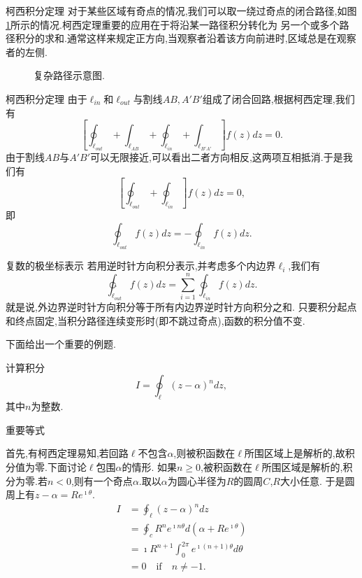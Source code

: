 \documentclass[fontset=windows, chinese, 10pt]{beamer}
\begin{document}
\begin{frame}{柯西积分定理}
  \small
  对于某些区域有奇点的情况,我们可以取一绕过奇点的闭合路径,如图\ref{fig:complexregion}所示的情况.柯西定理重要的应用在于将沿某一路径积分转化为
另一个或多个路径积分的求和.通常这样来规定正方向,当观察者沿着该方向前进时,区域总是在观察者的左侧.
\begin{figure}
    \centering
    \scalebox{0.6}{
    
    }
    \caption{复杂路径示意图.}
    \label{fig:complexregion}
\end{figure}

  \end{frame}
  

  \begin{frame}{柯西积分定理}
由于$\ell_{in}$和$\ell_{out}$与割线$AB,A'B'$组成了闭合回路,根据柯西定理,我们有
\[
    \left[ \oint _{\ell_{out}} + \int _{\ell_{AB}} + \oint _{\ell_{in}} + \int _{\ell_{B'A'}} \right] f(z) dz = 0 .
\]   
由于割线$AB$与$A'B'$可以无限接近,可以看出二者方向相反,这两项互相抵消.于是我们有
\[
    \left[ \oint _{\ell_{out}} + \oint _{\ell_{in}}  \right] f(z) dz = 0,
\]
即
\[
    \oint_{\ell_{out}} f(z) dz = - \oint _{\ell_{in}}f(z) dz .
\]

\end{frame}

\begin{frame}{复数的极坐标表示}
  若用逆时针方向积分表示,并考虑多个内边界$\ell_{i}$,我们有
\begin{equation}
    \ointctrclockwise_{\ell_{out}} f(z) dz = \sum_{i=1}^{n} \ointctrclockwise_{\ell_{in}} f(z) dz .
    \label{eq:cauchy_integral_summation}
\end{equation}
就是说,外边界逆时针方向积分等于所有内边界逆时针方向积分之和.
只要积分起点和终点固定,当积分路径连续变形时(即不跳过奇点),函数的积分值不变.

下面给出一个重要的例题.
\begin{example}
计算积分\[ I = \oint_\ell (z-\alpha)^n dz, \]其中$n$为整数.
\label{ex:integral}
\end{example}

\end{frame}


\begin{frame}{重要等式}
\small
\begin{solution}
首先,有柯西定理易知,若回路$\ell$不包含$\alpha$,则被积函数在$\ell$所围区域上是解析的,故积分值为零.下面讨论$\ell$包围$\alpha$的情形.
如果$n\geq 0$,被积函数在$\ell$所围区域是解析的,积分为零.若$n<0$,则有一个奇点$\alpha$.取以$\alpha$为圆心半径为$R$的圆周$C$,$R$大小任意.
于是圆周上有$z-\alpha = Re^{\imath \theta}$.
$$
\begin{aligned}
    I &= \oint_\ell (z-\alpha)^n dz\\
     &= \oint_c R^n e^{\imath n \theta} d (\alpha + R e^{\imath \theta})\\
     & =  \imath R^{n+1} \int_0^{2\pi} e^{\imath (n+1)\theta}  d\theta \\
     & = 0 \quad \textrm{if} \quad n\neq -1.
\end{aligned}
$$
\end{solution}
\end{frame}
\end{document}
